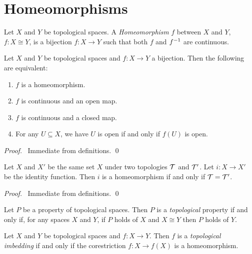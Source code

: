 \section{Homeomorphisms}

\begin{definition}[Homeomorphism]
    Let $X$ and $Y$ be topological spaces. A \emph{Homeomorphism} $f$ between $X$ and $Y$, $f : X \cong Y$,
    is a bijection $f : X \rightarrow Y$ such that both $f$ and ${f}^{-1}$ are continuous.
\end{definition}

\begin{lemma}
    \label{lemma:homeomorphism}
    Let $X$ and $Y$ be topological spaces and $f : X \rightarrow Y$ a bijection. Then the following are
    equivalent:
    \begin{enumerate}
        \item $f$ is a homeomorphism.
        \item $f$ is continuous and an open map.
        \item $f$ is continuous and a closed map.
        \item For any $U \subseteq X$, we have $U$ is open if and only if $f(U)$ is open.
    \end{enumerate}
\end{lemma}

\begin{proof}
    \pf\ Immediate from definitions. \qed
\end{proof}

\begin{proposition}
    Let $X$ and $X'$ be the same set $X$ under two topologies $\mathcal{T}$ and $\mathcal{T}'$. Let $i : X \rightarrow X'$
    be the identity function. Then $i$ is a homeomorphism if and only if $\mathcal{T} = \mathcal{T}'$.
\end{proposition}

\begin{proof}
    \pf\ Immediate from definitions. \qed
\end{proof}

\begin{definition}
    Let $P$ be a property of topological spaces. Then $P$ is a \emph{topological} property if and only if,
    for any spaces $X$ and $Y$, if $P$ holds of $X$ and $X \cong Y$ then $P$ holds of $Y$.
\end{definition}

\begin{definition}
    Let $X$ and $Y$ be topological spaces and $f : X \rightarrow Y$. Then $f$ is a \emph{topological
    imbedding} if and only if the corestriction $f : X \rightarrow f(X)$ is a homeomorphism.
\end{definition}

